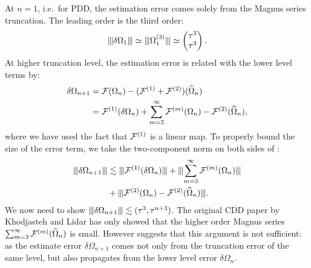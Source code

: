 \documentclass[b5paper,11pt]{article}
\begin{document}
At $n=1$,  i.e.\ for PDD, the estimation error comes solely from the Magnus series truncation. The leading order is the third order:
\begin{equation}
\opnorm{\delta\Omega_{1}}
\simeq \opnorm{\Omega_{1}\up{3}} \simeq
\begin{pmatrix}
\tau^3\\
\tau^3
\end{pmatrix}.
\end{equation}
At higher truncation level, the estimation error is related with the lower level terms by:
\begin{equation}\label{eq:error update}
 \begin{aligned}
\delta\Omega_{n+1} 
&=\mathcal{F}(\Omega_{n})-(\mathcal{F}^{(1)}+\mathcal{F}^{(2)})(\widehat{\Omega}_{n})\\
&= \mathcal{F}^{(1)}(\delta\Omega_{n})+ \sum_{m=2}^\infty \mathcal{F}^{(m)}(\Omega_{n})-\mathcal{F}^{(2)}(\widehat{\Omega}_{n}),
\end{aligned} 
\end{equation}
where we have used the fact that $\mathcal{F}^{(1)}$ is a linear map. 
To properly bound the size of the error term, we take the two-component norm on both sides of :
\begin{equation}
\begin{aligned}\label{eq:cdd-error-3terms}
\opnorm{\delta\Omega_{n+1} }
&\lesssim \opnorm{ \cF\up{1}(\delta\Omega_{n}) } + 
\opnorm{\sum_{m=3}^\infty \cF\up{m}( \Omega_{n})} \\
&+ \opnorm{ \cF\up{2}(\Omega_n)-\cF\up{2}(\Ohat_{n})}.
\end{aligned}    
\end{equation}
We now need to show $\opnorm{\delta\Omega_{n+1}}\lesssim(\tau^3,\tau^{n+3})$.
The original CDD paper by Khodjasteh and Lidar has only showed that the higher order Magnus series $\sum_{m=3}^\infty\mathcal{F}^{(m)}(\widehat{\Omega}_{n})$ is small.
However  suggests that this argument is not sufficient: as
the estimate error $\delta\Omega_{n+1}$ comes not only  from the truncation error of the same level, but also propagates from the lower level error $\delta\Omega_{n}$. 
\end{document}
